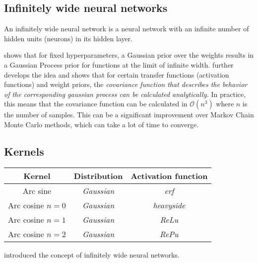 \subsection{Infinitely wide neural networks}%
\label{sub:infinitely_wide_neural_networks}

An infinitely wide neural network is a neural network with an infinite number of hidden units (neurons) in its hidden layer.

\Textcite{nealBayesianLearningNeural1996} shows that for fixed hyperparameters, a Gaussian prior over the weights
results in a Gaussian Process prior for functions at the limit of infinite width.
\Textcite{williamsComputationInfiniteNeural1998} further develops the idea and shows that for
certain transfer functions (activation functions) and weight priors, the
\emph{covariance function that describes the behavior of the
corresponding gaussian process can be calculated analytically.} In practice,
this means that the covariance function can be calculated in $\mathcal{O}(n^3)$ where
$n$ is the number of samples. This can be a significant improvement over Markov Chain Monte
Carlo methods, which can take a lot of time to converge.

\Textcite{bishopChapterSinglelayerNetworks1995}

\subsection{Kernels}
\label{sub:kernels}

\begin{table}[H]
    \begin{tabular}{ccc}
        \toprule
        \textbf{Kernel} & \textbf{Distribution} & \textbf{Activation function} \\
        \midrule
        Arc sine & \textit{Gaussian} & \textit{erf} \\
        Arc cosine $n=0$ & \textit{Gaussian} & \textit{heavyside} \\
        Arc cosine $n=1$ & \textit{Gaussian} & \textit{ReLu} \\
        Arc cosine $n=2$ & \textit{Gaussian} & \textit{RePu} \\
        \bottomrule
    \end{tabular}
\end{table}

\Textcite{williamsComputationInfiniteNeural1998} introduced the concept of
infinitely wide neural networks.

\textcite{nealBayesianLearningNeural1996}

